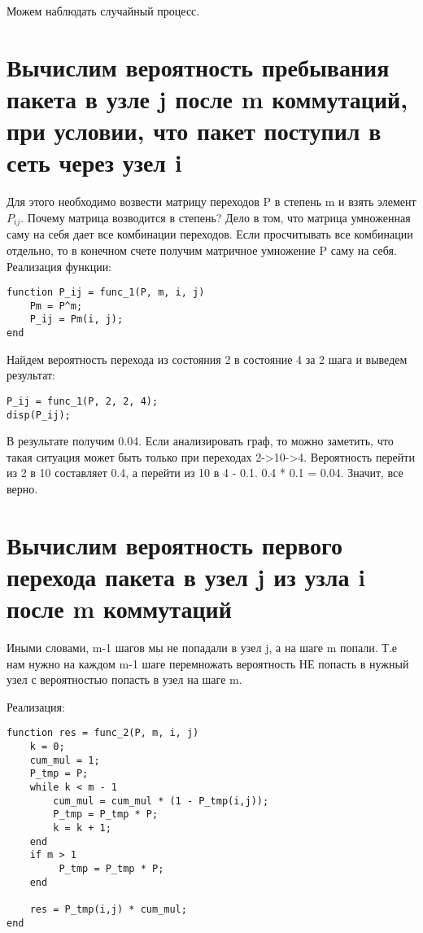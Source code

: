 Можем наблюдать случайный процесс.

\section*{\textbf{Вычислим вероятность пребывания пакета в узле j после m коммутаций, при условии, что пакет поступил в сеть через узел i}}

Для этого необходимо возвести матрицу переходов P в степень m и взять элемент $P_{ij}$. Почему матрица возводится в степень?
Дело в том, что матрица умноженная саму на себя дает все комбинации переходов. Если просчитывать все комбинации отдельно, то в 
конечном счете получим матричное умножение P саму на себя. \\

Реализация функции:

\begin{lstlisting}
function P_ij = func_1(P, m, i, j)
    Pm = P^m;         
    P_ij = Pm(i, j); 
end
\end{lstlisting}

Найдем вероятность перехода из состояния 2 в состояние 4 за 2 шага и выведем результат:

\begin{lstlisting}
P_ij = func_1(P, 2, 2, 4);
disp(P_ij);
\end{lstlisting}

В результате получим 0.04. Если анализировать граф, то можно заметить, что такая ситуация может быть только при переходах 2->10->4.
Вероятность перейти из 2 в 10 составляет 0.4, а перейти из 10 в 4 - 0.1. 0.4 * 0.1 = 0.04. Значит, все верно.

\section*{\textbf{Вычислим вероятность первого перехода пакета в узел j из узла i после m коммутаций}}

Иными словами, m-1 шагов мы не попадали в узел j, а на шаге m попали. Т.е нам нужно на каждом m-1 шаге перемножать вероятность
НЕ попасть в нужный узел с вероятностью попасть в узел на шаге m.

Реализация:

\begin{lstlisting}
function res = func_2(P, m, i, j)
    k = 0;
    cum_mul = 1;
    P_tmp = P;
    while k < m - 1
        cum_mul = cum_mul * (1 - P_tmp(i,j));
        P_tmp = P_tmp * P; 
        k = k + 1;
    end
    if m > 1
         P_tmp = P_tmp * P;
    end
   
    res = P_tmp(i,j) * cum_mul;
end

\end{lstlisting}

